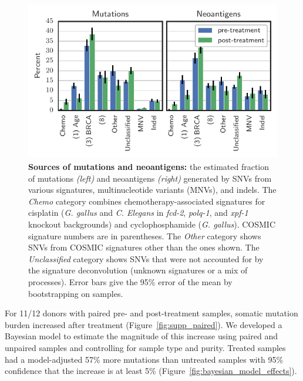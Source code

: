 \begin{figure}[htbp]
\centering
\includegraphics[scale=1.0]{figures/sources_of_mutations_and_neoantigens.pdf}
\caption{\textbf{Sources of mutations and neoantigens:} the estimated fraction of mutations \textit{(left)} and neoantigens \textit{(right)} generated by SNVs from various signatures, multinucleotide variants (MNVs), and indels. The \textit{Chemo} category combines chemotherapy-associated signatures for cisplatin (\textit{G. gallus} and \textit{C. Elegans} in \textit{fcd-2}, \textit{polq-1}, and \textit{xpf-1} knockout backgrounds) and cyclophosphamide (\textit{G. gallus}). COSMIC signature numbers are in parentheses. The \textit{Other} category shows SNVs from COSMIC signatures other than the ones shown. The \textit{Unclassified} category shows SNVs that were not accounted for by the signature deconvolution (unknown signatures or a mix of processes). Error bars give the 95\% error of the mean by bootstrapping on samples.}
\label{fig:sources}
\end{figure}


For 11/12 donors with paired pre- and post-treatment samples, somatic mutation burden increased after treatment (Figure~\ref{fig:supp_paired}). We developed a Bayesian model to estimate the magnitude of this increase using paired and unpaired samples and controlling for sample type and purity. Treated samples had a model-adjusted 57\% more mutations than untreated samples with 95\% confidence that the increase is at least 5\% (Figure~\ref{fig:bayesian_model_effects}).

